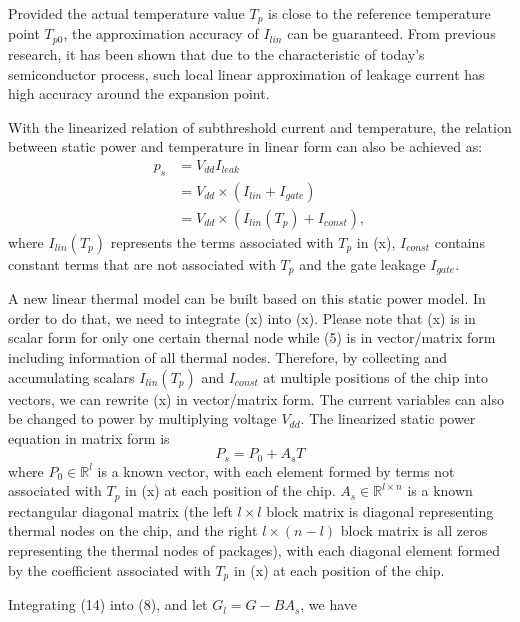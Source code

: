 Provided the actual temperature value $T_{p}$ is close to the reference temperature point $T_{p0}$, the approximation accuracy of $I_{lin}$ can be guaranteed. From previous research, it has been shown that due to the characteristic of today's semiconductor process, such local linear approximation of leakage current has high accuracy around the expansion point.

With the linearized relation of subthreshold current and temperature, the relation between static power and temperature in linear form can also be achieved as:
\begin{equation}\label{linear_static}
\begin{split}
p_{s} &= V_{dd}I_{leak}\\
&= V_{dd} \times (I_{lin}+I_{gate})\\
&= V_{dd} \times (I_{lin}(T_{p})+I_{const}),
\end{split}
\end{equation}
where $I_{lin}(T_{p})$ represents the terms associated with $T_{p}$ in (x), $I_{const}$ contains constant terms that are not associated with $T_{p}$ and the gate leakage $I_{gate}$.

A new linear thermal model can be built based on this static power model. In order to do that, we need to integrate (x) into (x). Please note that (x) is in scalar form for only one certain thernal node while (5) is in vector/matrix form including information of all thermal nodes. Therefore, by collecting and accumulating scalars $I_{lin}(T_{p})$ and $I_{const}$ at multiple positions of the chip into vectors, we can rewrite (x) in vector/matrix form. The current variables can also be changed to power by multiplying voltage $V_{dd}$. The linearized static power equation in matrix form is
\begin{equation}\label{linear_static_matrix}
P_{s} = P_{0}+A_{s}T
\end{equation}
where $P_{0} \in \mathbb{R}^{l}$ is a known vector, with each element formed by terms not associated with $T_{p}$ in (x) at each position of the chip. $A_{s} \in \mathbb{R}^{l \times n}$ is a known rectangular diagonal matrix (the left $l \times l$ block matrix is diagonal representing thermal nodes on the chip, and the right $l \times (n-l)$ block matrix is all zeros representing the thermal nodes of packages), with each diagonal element formed by the coefficient associated with $T_{p}$ in (x) at each position of the chip.

Integrating (14) into (8), and let $G_{l} = G - BA_{s}$, we have

